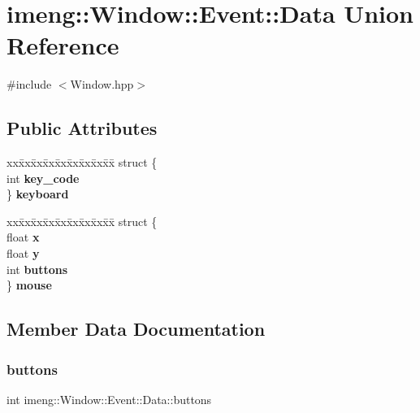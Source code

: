 \section{imeng\+::Window\+::Event\+::Data Union Reference}
\label{unionimeng_1_1_window_1_1_event_1_1_data}


{\ttfamily \#include $<$Window.\+hpp$>$}

\subsection*{Public Attributes}
\begin{DoxyCompactItemize}
\item 
\begin{tabbing}
xx\=xx\=xx\=xx\=xx\=xx\=xx\=xx\=xx\=\kill
struct \{\\
\>int \textbf{ key\_code}\\
\} \textbf{ keyboard}\\

\end{tabbing}\item 
\begin{tabbing}
xx\=xx\=xx\=xx\=xx\=xx\=xx\=xx\=xx\=\kill
struct \{\\
\>float \textbf{ x}\\
\>float \textbf{ y}\\
\>int \textbf{ buttons}\\
\} \textbf{ mouse}\\

\end{tabbing}\end{DoxyCompactItemize}


\subsection{Member Data Documentation}
\mbox{\label{unionimeng_1_1_window_1_1_event_1_1_data_a94fb4cd727bdf7e6975e22620d5fe438}} 
\subsubsection{buttons}
{\footnotesize\ttfamily int imeng\+::\+Window\+::\+Event\+::\+Data\+::buttons}

\mbox{\label{unionimeng_1_1_window_1_1_event_1_1_data_afc507cb548b57e2737ec04855add630c}} 
